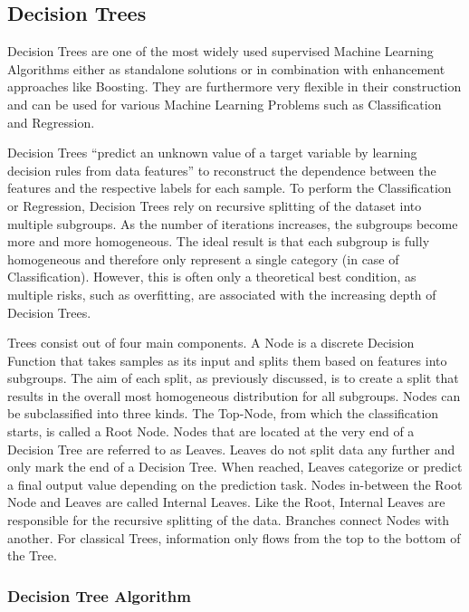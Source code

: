 \subsection{Decision Trees}

Decision Trees are one of the most widely used supervised Machine Learning Algorithms either 
as standalone solutions or in combination with enhancement approaches like Boosting. They are 
furthermore very flexible in their construction and can be used for various Machine Learning 
Problems such as Classification and Regression. 

Decision Trees “predict an unknown value of a target variable by learning decision rules from 
data features” to reconstruct the dependence between the features and the respective labels for 
each sample. To perform the Classification or Regression, Decision Trees rely on recursive 
splitting of the dataset into multiple subgroups. As the number of iterations increases, the 
subgroups become more and more homogeneous. The ideal result is that each subgroup is fully 
homogeneous and therefore only represent a single category (in case of Classification). However, 
this is often only a theoretical best condition, as multiple risks, such as overfitting, are 
associated with the increasing depth of Decision Trees.

Trees consist out of four main components. A Node is a discrete Decision Function that takes 
samples as its input and splits them based on features into subgroups. The aim of each split, 
as previously discussed, is to create a split that results in the overall most homogeneous 
distribution for all subgroups. Nodes can be subclassified into three kinds. The Top-Node, 
from which the classification starts, is called a Root Node. Nodes that are located at the 
very end of a Decision Tree are referred to as Leaves. Leaves do not split data any further and 
only mark the end of a Decision Tree. When reached, Leaves categorize or predict a final output 
value depending on the prediction task. Nodes in-between the Root Node and Leaves are called 
Internal Leaves. Like the Root, Internal Leaves are responsible for the recursive splitting of 
the data. Branches connect Nodes with another. For classical Trees, information only flows from 
the top to the bottom of the Tree. 

\subsubsection{Decision Tree Algorithm}

